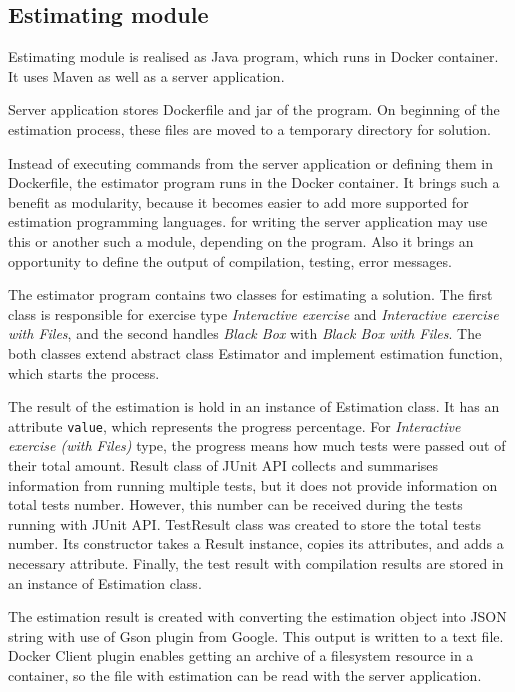         
        \subsection{Estimating module}
        Estimating module is realised as Java program, which runs in Docker container. It uses Maven as well as a server application.
        
        Server application stores Dockerfile and jar of the program. On beginning of the estimation process, these files are moved to a temporary directory for solution. 
        
        Instead of executing commands from the server application or defining them in Dockerfile, the estimator program runs in the Docker container. It brings such a benefit as modularity, because it becomes easier to add more supported for estimation programming languages. 
        for writing the server application may use this or another such a module, depending on the program. Also it brings an opportunity to define the output of compilation, testing, error messages.
        
        The estimator program contains two classes for estimating a solution. The first class is responsible for exercise type \textit{Interactive exercise} and \textit{Interactive exercise with Files}, and the second handles \textit{Black Box} with \textit{Black Box with Files}. The both classes extend abstract class Estimator and implement estimation function, which starts the process.
        
        The result of the estimation is hold in an instance of Estimation class. It has an attribute \texttt{value}, which represents the progress percentage. For \textit{Interactive exercise (with Files)} type, the progress means how much tests were passed out of their total amount. Result class of JUnit API collects and summarises information from running multiple tests, but it does not provide information on total tests number. However, this number can be received during the tests running with JUnit API. TestResult class was created to store the total tests number. Its constructor takes a Result instance, copies its attributes, and adds a necessary attribute. Finally, the test result with compilation results are stored in an instance of Estimation class.
        
        The estimation result is created with converting the estimation object into JSON string with use of Gson plugin from Google. This output is written to a text file. Docker Client plugin enables getting an archive of a filesystem resource in a container, so the file with estimation can be read with the server application.
        

